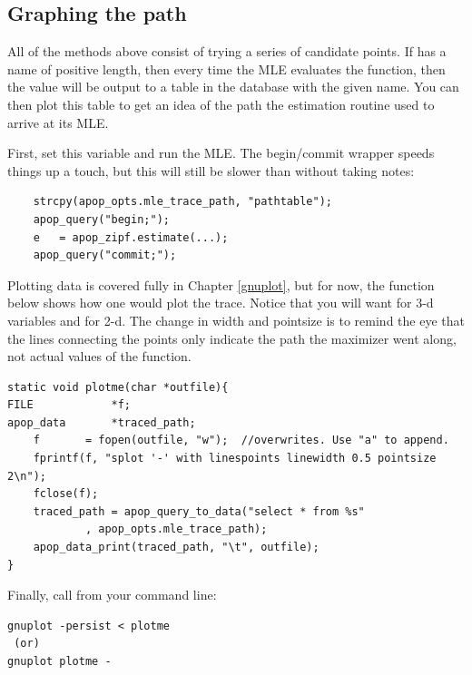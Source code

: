 \subsection{Graphing the path} All of the methods above consist of
trying a series of candidate points. 
If 
has a name of positive
length, then every time the MLE evaluates the function, then the value
will be output to a table in the database with the given name. You can
then plot this table to get an idea of the path the estimation routine
used to arrive at its MLE.

First, set this variable and run the MLE. The begin/commit wrapper
speeds things up a touch, but this will still be slower than without
taking notes:
\begin{lstlisting}
    strcpy(apop_opts.mle_trace_path, "pathtable");
    apop_query("begin;");
    e   = apop_zipf.estimate(...);
    apop_query("commit;");
\end{lstlisting}
Plotting data is covered fully in Chapter \ref{gnuplot}, but for now,
the function below shows how one would plot the trace.  Notice that
you will want  for 3-d variables and  for
2-d. The change in width and pointsize is to remind the eye that the
lines connecting the points only indicate the path the maximizer went
along, not actual values of the function.

\begin{lstlisting}
static void plotme(char *outfile){
FILE            *f;
apop_data       *traced_path;
    f       = fopen(outfile, "w");  //overwrites. Use "a" to append.
    fprintf(f, "splot '-' with linespoints linewidth 0.5 pointsize 2\n");
    fclose(f);
    traced_path = apop_query_to_data("select * from %s"
            , apop_opts.mle_trace_path);
    apop_data_print(traced_path, "\t", outfile);
}
\end{lstlisting}

Finally, call  from your command line:
\begin{lstlisting}
gnuplot -persist < plotme
 (or)
gnuplot plotme -
\end{lstlisting}

